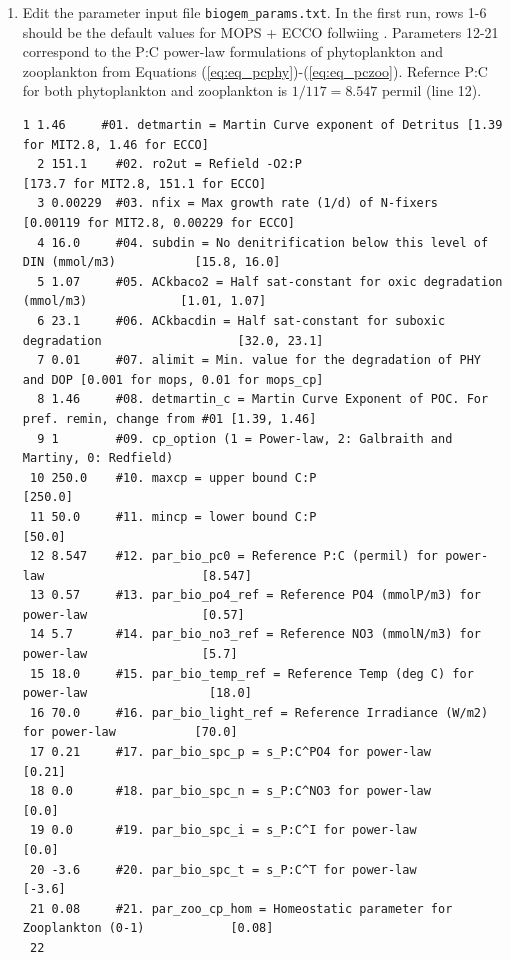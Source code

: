 \documentclass[a4paper]{article}
\begin{document}
\begin{enumerate}
\item Edit the parameter input file \verb|biogem_params.txt|. In the first run, rows 1-6 should be the default values for MOPS + ECCO follwiing \cite{Kriest20}. Parameters 12-21 correspond to the P:C power-law formulations of phytoplankton and zooplankton from Equations (\ref{eq:eq_pcphy})-(\ref{eq:eq_pczoo}). Refernce P:C for both phytoplankton and zooplankton is $1/117 = 8.547$ permil (line 12). 
\begin{lstlisting}[frame=single,basicstyle=\scriptsize,commentstyle=\color{blue}]
  1 1.46     #01. detmartin = Martin Curve exponent of Detritus [1.39 for MIT2.8, 1.46 for ECCO]
  2 151.1    #02. ro2ut = Refield -O2:P                         [173.7 for MIT2.8, 151.1 for ECCO]
  3 0.00229  #03. nfix = Max growth rate (1/d) of N-fixers      [0.00119 for MIT2.8, 0.00229 for ECCO]
  4 16.0     #04. subdin = No denitrification below this level of DIN (mmol/m3)           [15.8, 16.0]
  5 1.07     #05. ACkbaco2 = Half sat-constant for oxic degradation (mmol/m3)             [1.01, 1.07]
  6 23.1     #06. ACkbacdin = Half sat-constant for suboxic degradation                   [32.0, 23.1]
  7 0.01     #07. alimit = Min. value for the degradation of PHY and DOP [0.001 for mops, 0.01 for mops_cp]
  8 1.46     #08. detmartin_c = Martin Curve Exponent of POC. For pref. remin, change from #01 [1.39, 1.46]
  9 1        #09. cp_option (1 = Power-law, 2: Galbraith and Martiny, 0: Redfield)
 10 250.0    #10. maxcp = upper bound C:P                                                 [250.0]
 11 50.0     #11. mincp = lower bound C:P                                                 [50.0]
 12 8.547    #12. par_bio_pc0 = Reference P:C (permil) for power-law                      [8.547]
 13 0.57     #13. par_bio_po4_ref = Reference PO4 (mmolP/m3) for power-law                [0.57]
 14 5.7      #14. par_bio_no3_ref = Reference NO3 (mmolN/m3) for power-law                [5.7]
 15 18.0     #15. par_bio_temp_ref = Reference Temp (deg C) for power-law                 [18.0]
 16 70.0     #16. par_bio_light_ref = Reference Irradiance (W/m2) for power-law           [70.0]
 17 0.21     #17. par_bio_spc_p = s_P:C^PO4 for power-law                                 [0.21]
 18 0.0      #18. par_bio_spc_n = s_P:C^NO3 for power-law                                 [0.0]
 19 0.0      #19. par_bio_spc_i = s_P:C^I for power-law                                   [0.0]
 20 -3.6     #20. par_bio_spc_t = s_P:C^T for power-law                                   [-3.6]
 21 0.08     #21. par_zoo_cp_hom = Homeostatic parameter for Zooplankton (0-1)            [0.08]
 22
\end{lstlisting}


\end{enumerate}
\end{document}
